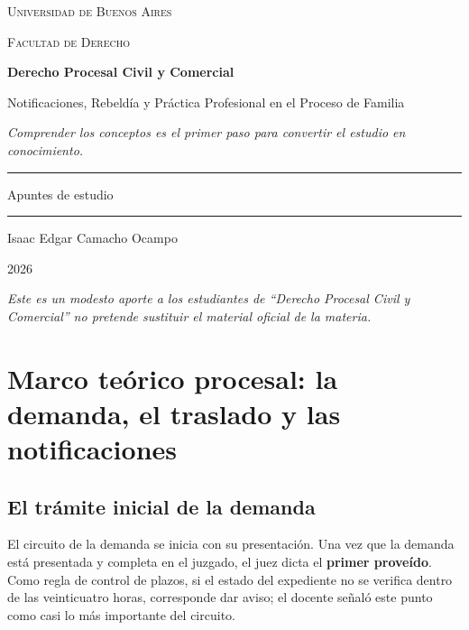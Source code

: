 \documentclass[12pt,oneside]{book}
\newcommand{\universidad}{Universidad de Buenos Aires}
\newcommand{\facultad}{Facultad de Derecho}
\newcommand{\materia}{Derecho Procesal Civil y Comercial}
\newcommand{\titulo}{Notificaciones, Rebeldía y Práctica Profesional en el Proceso de Familia}
\newcommand{\autor}{Isaac Edgar Camacho Ocampo}
\newcommand{\anio}{2026}
\begin{document}
\begin{titlepage}
\thispagestyle{empty}
\begin{center}
\vspace*{1cm}
{\large \textsc{\universidad}}

\vspace{0.2cm}
{\large \textsc{\facultad}}

\vspace{3cm}
{\Huge \textbf{\materia}}

\vspace{1cm}
{\LARGE \titulo}

\vspace{0.8cm}
\textit{Comprender los conceptos es el primer paso para convertir el estudio en conocimiento.}

\vspace{1.2cm}
\rule{0.70\textwidth}{0.5pt}

\vspace{0.5cm}
{\large Apuntes de estudio}

\vspace{0.5cm}
\rule{0.70\textwidth}{0.5pt}

\vfill
{\large \autor}

\vspace{0.3cm}
{\large \anio}
\end{center}
\vfill
\begin{flushleft}
\textit{Este es un modesto aporte a los estudiantes de ``Derecho Procesal Civil y Comercial'' no pretende sustituir el material oficial de la materia.}
\end{flushleft}
\end{titlepage}

\tableofcontents

\chapter[Demanda, preclusión y notificaciones]{Marco teórico procesal: la demanda, el traslado y las notificaciones}

\section{El trámite inicial de la demanda}

El circuito de la demanda se inicia con su presentación. Una vez que la demanda está presentada y completa en el juzgado, el juez dicta el \textbf{primer proveído}. Como regla de control de plazos, si el estado del expediente no se verifica dentro de las veinticuatro horas, corresponde dar aviso; el docente señaló este punto como casi lo más importante del circuito.
\end{document}
